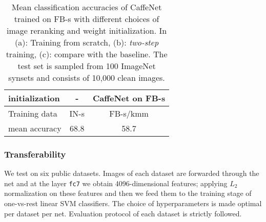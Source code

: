 \documentclass[preprint,12pt]{elsarticle}
\begin{document}
\begin{table}[!t]
{\begin{centering}
\begin{tabular}{l|cc}
initialization & - & CaffeNet on FB-s \tabularnewline
 \hline
Training data & IN-s & FB-s/kmm \tabularnewline
\hline\hline
mean accuracy & 68.8 & 58.7 \tabularnewline
\end{tabular}
\par\end{centering}
\label{table:acc_IN-s_vs_FB-s}}
\caption{Mean classification accuracies of CaffeNet trained on FB-s with different choices of image reranking and weight initialization. In (a): Training from scratch, (b): \emph{two-step} training, (c): compare with the baseline. The test set is sampled from 100 ImageNet synsets and consists of 10,000 clean images.}
\label{table:100}
\end{table}
\subsubsection{Transferability}\label{sec:transfer}
\noindent We test on six public datasets. Images of each dataset are forwarded through the net and at the layer \texttt{fc7} we obtain 4096-dimensional features; applying $L_2$ normalization on these features and then we feed them to the training stage of one-vs-rest linear SVM classifiers. The choice of hyperparameters is made optimal per dataset per net. Evaluation protocol of each dataset is strictly followed. 
\end{document}
